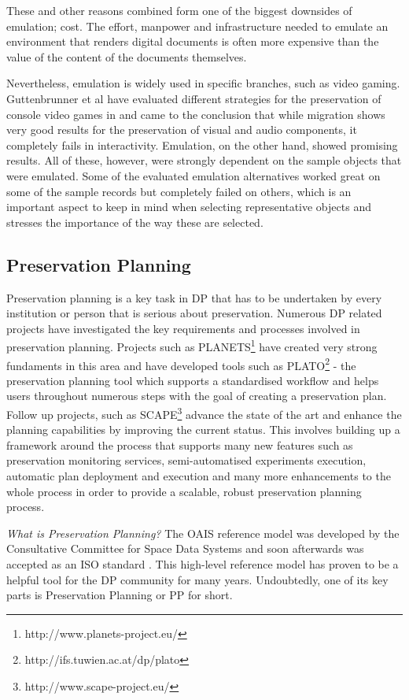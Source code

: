 These and other reasons combined form one of the biggest downsides of emulation; cost. The effort, manpower and infrastructure needed to emulate an environment that renders digital documents is often more expensive than the value of the content of the documents themselves.

Nevertheless, emulation is widely used in specific branches, such as video gaming.
Guttenbrunner et al have evaluated different strategies for the preservation of console video games in \cite{guttenbrunner:2008:evaluating} and came to the conclusion that while migration shows very good results for the preservation of visual and audio components, it completely fails in interactivity. Emulation, on the other hand, showed promising results. All of these, however, were strongly dependent on the sample objects that were emulated. Some of the evaluated emulation alternatives worked great on some of the sample records but completely failed on others, which is an important aspect to keep in mind when selecting representative objects and stresses the importance of the way these are selected.

\subsection{Preservation Planning}
\label{lbl:preservationplanning}
Preservation planning is a key task in DP that has to be undertaken by every institution or person that is serious about preservation. Numerous DP related projects have investigated the key requirements and processes involved in preservation planning. Projects such as PLANETS\footnote{http://www.planets-project.eu/} have created very strong fundaments in this area and have developed tools such as PLATO\footnote{http://ifs.tuwien.ac.at/dp/plato} - the preservation planning tool which supports a standardised workflow and helps users throughout numerous steps with the goal of creating a preservation plan. Follow up projects, such as SCAPE\footnote{http://www.scape-project.eu/} advance the state of the art and enhance the planning capabilities by improving the current status. This involves building up a framework around the process that supports many new features such as preservation monitoring services, semi-automatised experiments execution, automatic plan deployment and execution and many more enhancements to the whole process in order to provide a scalable, robust preservation planning process.\newline

\noindent\textit{What is Preservation Planning?}\newline
The OAIS reference model was developed by the Consultative Committee for Space Data Systems and soon afterwards was accepted as an ISO standard \cite{iso:2003:oais}. This high-level reference model has proven to be a helpful tool for the DP community for many years. Undoubtedly, one of its key parts is Preservation Planning or PP for short.

